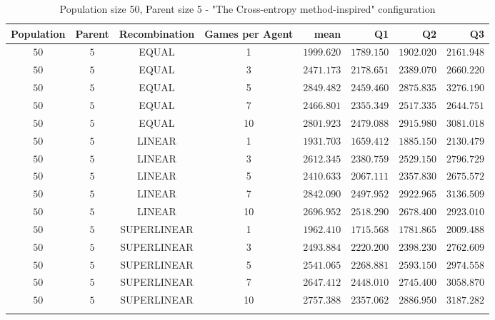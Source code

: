 \begin{table}[H]
\centering
\small
\begin{tabular}{c c c c r r r r}
Population & Parent & Recombination & Games per Agent & mean & Q1 & Q2 & Q3\\
\hline
$50$ & $5$ & EQUAL & 1 & $1999.620$ & $1789.150$ & $1902.020$ & $2161.948$\\
$50$ & $5$ & EQUAL & 3 & $2471.173$ & $2178.651$ & $2389.070$ & $2660.220$\\
$50$ & $5$ & EQUAL & 5 & $2849.482$ & $2459.460$ & $2875.835$ & $3276.190$\\
$50$ & $5$ & EQUAL & 7 & $2466.801$ & $2355.349$ & $2517.335$ & $2644.751$\\
\hdashline
$50$ & $5$ & EQUAL & 10 & $2801.923$ & $2479.088$ & $2915.980$ & $3081.018$\\
\hdashline
$50$ & $5$ & LINEAR & 1 & $1931.703$ & $1659.412$ & $1885.150$ & $2130.479$\\
$50$ & $5$ & LINEAR & 3 & $2612.345$ & $2380.759$ & $2529.150$ & $2796.729$\\
$50$ & $5$ & LINEAR & 5 & $2410.633$ & $2067.111$ & $2357.830$ & $2675.572$\\
\hdashline
$50$ & $5$ & LINEAR & 7 & $2842.090$ & $2497.952$ & $2922.965$ & $3136.509$\\
\hdashline
$50$ & $5$ & LINEAR & 10 & $2696.952$ & $2518.290$ & $2678.400$ & $2923.010$\\
$50$ & $5$ & SUPERLINEAR & 1 & $1962.410$ & $1715.568$ & $1781.865$ & $2009.488$\\
$50$ & $5$ & SUPERLINEAR & 3 & $2493.884$ & $2220.200$ & $2398.230$ & $2762.609$\\
$50$ & $5$ & SUPERLINEAR & 5 & $2541.065$ & $2268.881$ & $2593.150$ & $2974.558$\\
$50$ & $5$ & SUPERLINEAR & 7 & $2647.412$ & $2448.010$ & $2745.400$ & $3058.870$\\
\hdashline
$50$ & $5$ & SUPERLINEAR & 10 & $2757.388$ & $2357.062$ & $2886.950$ & $3187.282$\\
\hdashline
\end{tabular}
\caption{Population size 50, Parent size 5 - "The Cross-entropy method-inspired" configuration}
\end{table}

